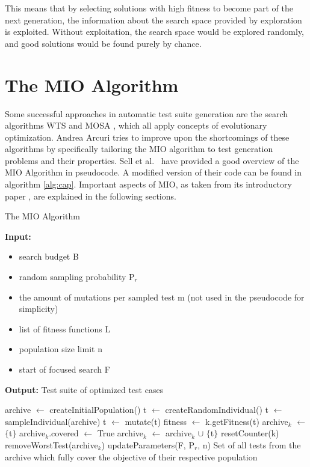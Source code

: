 \documentclass[
  a4paper,  %
  twoside,  %
  bibliography=totoc,
  headsepline,
  cleardoublepage=empty,
  parskip=half,
  draft=false
]{scrbook}
\begin{document}
This means that by selecting solutions with high fitness to become part of the next generation, the information about the search space provided by exploration is exploited. Without exploitation, the search space would be explored randomly, and good solutions would be found purely by chance.

\section{The MIO Algorithm}\label{sec:mio}

Some successful approaches in automatic test suite generation are the search algorithms WTS \cite{fraser2012whole} and MOSA \cite{panichella2017automated}, which all apply concepts of evolutionary optimization.
Andrea Arcuri \cite{arcuri2018test} tries to improve upon the shortcomings of these algorithms by specifically tailoring the MIO algorithm to test generation problems and their properties.
Sell et al.~\cite{sell2019empirical} have provided a good overview of the MIO Algorithm in pseudocode. A modified version of their code can be found in algorithm \ref{alg:cap}.
Important aspects of MIO, as taken from its introductory paper \cite{arcuri2018test}, are explained in the following sections.

\begin{algorithm}
	\caption{The MIO Algorithm}\label{alg:cap}
	\textbf{Input:} 
	\begin{itemize}
		\item search budget B
		\item random sampling probability P$_r$
		\item the amount of mutations per sampled test m (not used in the pseudocode for simplicity)
		\item list of fitness functions L
		\item population size limit n
		\item start of focused search F
	\end{itemize}
	\textbf{Output:} Test suite of optimized test cases
	\begin{algorithmic}[1]
		\State archive $\gets$ createInitialPopulation()
		\label{alg:bud}
		 \label{alg:prob}
		\State t $\gets$ createRandomIndividual()
		\Else
		\State t $\gets$ sampleIndividual(archive)
		\State t $\gets$ mutate(t)
		\EndIf
		 \label{alg:eval}
		\State fitness $\gets$ k.getFitness(t)
		 \label{alg:cov}
		\State archive$_k$ $\gets$ $\{$t$\}$
		\State archive$_k$.covered $\gets$ True
		 \label{alg:rem}
		\State archive$_k$ $\gets$ archive$_k$ $\cup$ $\{$t$\}$
		\State resetCounter(k)  \label{alg:reset}
		 \label{alg:rem1}
		\State removeWorstTest(archive$_k$)
		\EndIf
		\EndIf
		\State updateParameters(F, P$_r$, n)
		\EndFor
		\EndWhile
		\State \Return Set of all tests from the archive which fully cover the objective of their respective population
	\end{algorithmic}
\end{algorithm}
\end{document}
